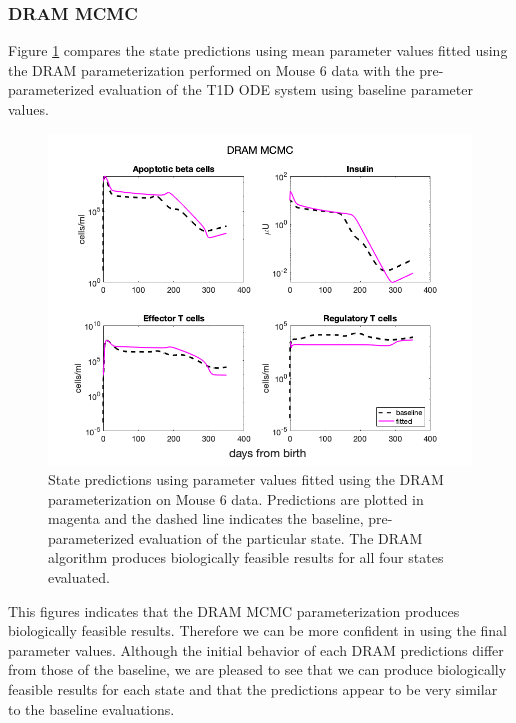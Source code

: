\subsubsection{DRAM MCMC} \label{biocheck_dram}
Figure \ref{fig:dram_biocheck} compares the state predictions using mean parameter values fitted using the DRAM parameterization performed on Mouse 6 data with the pre-parameterized evaluation of the T1D ODE system using baseline parameter values.
\begin{figure}[H] 
    \centering
    \includegraphics[width=15cm]{MCMC_figs/dram_t1d_final/mouse6_importantStates.png}
    \caption{State predictions using parameter values fitted using the DRAM parameterization on Mouse 6 data. Predictions are plotted in magenta and the dashed line indicates the baseline, pre-parameterized evaluation of the particular state. The DRAM algorithm produces biologically feasible results for all four states evaluated.}
    \label{fig:dram_biocheck}
\end{figure}
This figures indicates that the DRAM MCMC parameterization produces biologically feasible results. Therefore we can be more confident in using the final parameter values. Although the initial behavior of each DRAM predictions differ from those of the baseline, we are pleased to see that we can produce biologically feasible results for each state and that the predictions appear to be very similar to the baseline evaluations. 
